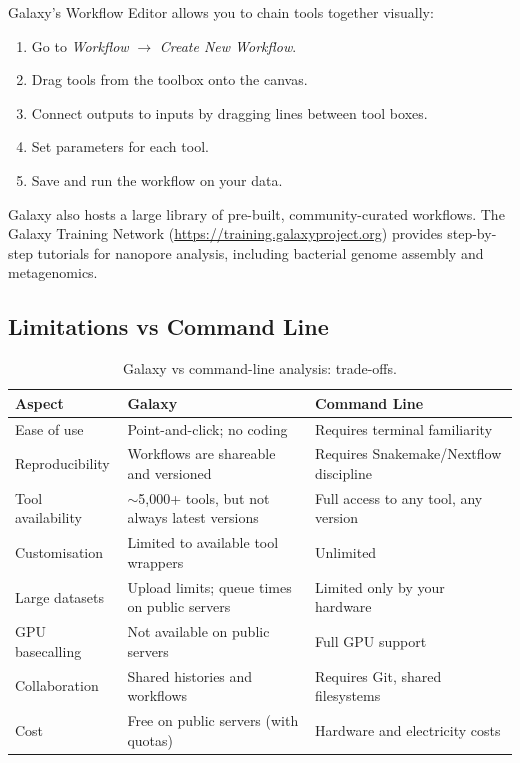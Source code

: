 Galaxy's Workflow Editor allows you to chain tools together visually:
\begin{enumerate}[nosep]
  \item Go to \textit{Workflow} $\rightarrow$ \textit{Create New Workflow}.
  \item Drag tools from the toolbox onto the canvas.
  \item Connect outputs to inputs by dragging lines between tool boxes.
  \item Set parameters for each tool.
  \item Save and run the workflow on your data.
\end{enumerate}

Galaxy also hosts a large library of pre-built, community-curated workflows. The Galaxy Training Network (\url{https://training.galaxyproject.org}) provides step-by-step tutorials for nanopore analysis, including bacterial genome assembly and metagenomics.

\subsection{Limitations vs Command Line}
\label{subsec:diyanalysis:galaxy_limits}

\begin{table}[htbp]
\centering
\caption{Galaxy vs command-line analysis: trade-offs.}
\label{tab:diy_galaxy_comparison}
\begin{tabularx}{\textwidth}{@{}lXX@{}}
\toprule
\textbf{Aspect} & \textbf{Galaxy} & \textbf{Command Line} \\
\midrule
Ease of use & Point-and-click; no coding & Requires terminal familiarity \\
Reproducibility & Workflows are shareable and versioned & Requires Snakemake/Nextflow discipline \\
Tool availability & $\sim$5,000+ tools, but not always latest versions & Full access to any tool, any version \\
Customisation & Limited to available tool wrappers & Unlimited \\
Large datasets & Upload limits; queue times on public servers & Limited only by your hardware \\
GPU basecalling & Not available on public servers & Full GPU support \\
Collaboration & Shared histories and workflows & Requires Git, shared filesystems \\
Cost & Free on public servers (with quotas) & Hardware and electricity costs \\
\bottomrule
\end{tabularx}
\end{table}

